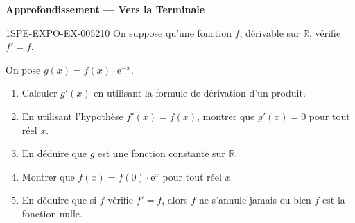 \begin{center}\textbf{Approfondissement — Vers la Terminale}\end{center}
\begin{exercice}{1SPE-EXPO-EX-005}{2}{10}
On suppose qu'une fonction $f$, dérivable sur $\mathbb{R}$, vérifie $f' = f$.

On pose $g(x) = f(x) \cdot \mathrm{e}^{-x}$.
\begin{enumerate}
\item Calculer $g'(x)$ en utilisant la formule de dérivation d'un produit.
\item En utilisant l'hypothèse $f'(x) = f(x)$, montrer que $g'(x) = 0$ pour tout réel $x$.
\item En déduire que $g$ est une fonction constante sur $\mathbb{R}$.
\item Montrer que $f(x) = f(0) \cdot \mathrm{e}^x$ pour tout réel $x$.
\item En déduire que si $f$ vérifie $f' = f$, alors $f$ ne s'annule jamais ou bien $f$ est la fonction nulle.
\end{enumerate}
\end{exercice}
